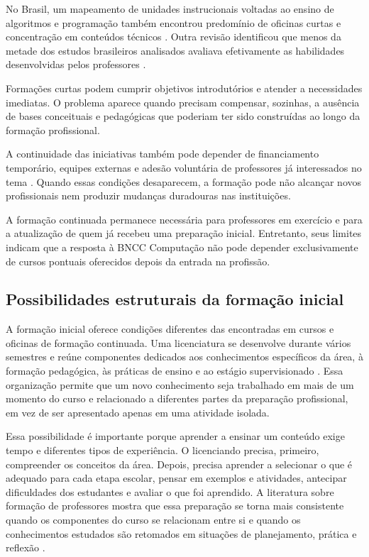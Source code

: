 No Brasil, um mapeamento de unidades instrucionais voltadas ao ensino de algoritmos e programação também encontrou predomínio de oficinas curtas e concentração em conteúdos técnicos \cite{kretzer2020formacao}. Outra revisão identificou que menos da metade dos estudos brasileiros analisados avaliava efetivamente as habilidades desenvolvidas pelos professores \cite{sokolonski2021revisao}.

Formações curtas podem cumprir objetivos introdutórios e atender a necessidades imediatas. O problema aparece quando precisam compensar, sozinhas, a ausência de bases conceituais e pedagógicas que poderiam ter sido construídas ao longo da formação profissional.

A continuidade das iniciativas também pode depender de financiamento temporário, equipes externas e adesão voluntária de professores já interessados no tema \cite{basu2021building}. Quando essas condições desaparecem, a formação pode não alcançar novos profissionais nem produzir mudanças duradouras nas instituições.

A formação continuada permanece necessária para professores em exercício e para a atualização de quem já recebeu uma preparação inicial. Entretanto, seus limites indicam que a resposta à BNCC Computação não pode depender exclusivamente de cursos pontuais oferecidos depois da entrada na profissão.

\subsection{Possibilidades estruturais da formação inicial}
\label{subsec:possibilidades-formacao-inicial}

A formação inicial oferece condições diferentes das encontradas em cursos e oficinas de formação continuada. Uma licenciatura se desenvolve durante vários semestres e reúne componentes dedicados aos conhecimentos específicos da área, à formação pedagógica, às práticas de ensino e ao estágio supervisionado \cite{brasil2024resolucao4}. Essa organização permite que um novo conhecimento seja trabalhado em mais de um momento do curso e relacionado a diferentes partes da preparação profissional, em vez de ser apresentado apenas em uma atividade isolada.

Essa possibilidade é importante porque aprender a ensinar um conteúdo exige tempo e diferentes tipos de experiência. O licenciando precisa, primeiro, compreender os conceitos da área. Depois, precisa aprender a selecionar o que é adequado para cada etapa escolar, pensar em exemplos e atividades, antecipar dificuldades dos estudantes e avaliar o que foi aprendido. A literatura sobre formação de professores mostra que essa preparação se torna mais consistente quando os componentes do curso se relacionam entre si e quando os conhecimentos estudados são retomados em situações de planejamento, prática e reflexão \cite{DarlingHammond2005Design,hammerness2006coherence}.

